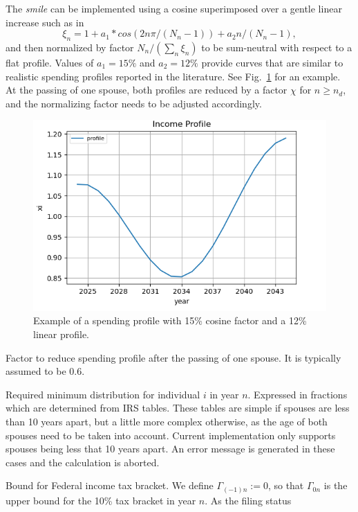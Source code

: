 \documentclass{report}[fleqn,12pt]
\begin{document}
\begin{description}[leftmargin=4em,style=multiline]
	The {\em smile} can be implemented using a cosine superimposed over a gentle linear increase
	such as in
	\begin{equation}
		\xi_n = 1 + a_1*cos(2n\pi/(N_n-1)) + a_2n/(N_n-1),
	\end{equation}
	and then normalized by factor $N_n/(\sum_n \xi_n )$ to be sum-neutral with respect to a flat profile.
	Values of $a_1 = 15\%$ and $a_2=12\%$ provide curves that are similar to realistic
		spending profiles reported in the literature. See Fig.~\ref{Fig:profile} for an example.
	At the passing of one spouse, both profiles are reduced by a factor $\chi$ for $n \ge n_d$,
	and the normalizing factor needs to be adjusted accordingly.
		\begin{figure}[t]
		\includegraphics{profile.png}
		\caption{\small Example of a spending profile with 15\% cosine factor and a 12\% linear
		profile. \label{Fig:profile}}
		\end{figure}
\item [$\chi$]
	Factor to reduce spending profile after the passing of one spouse. It is typically
	assumed to be 0.6.
\item [$\rho_{in}$]
	Required minimum distribution for individual $i$ in year $n$. Expressed in fractions
	which are determined from IRS tables. These tables are simple if spouses are less than 10 years apart,
	but a little more complex otherwise, as the age of both spouses need to be taken into account.
	Current implementation only supports spouses being less that 10 years apart.
	An error message is generated in these cases and the calculation is aborted.
\item [$\Gamma_{tn}$]
	Bound for Federal income tax bracket. We define $\Gamma_{(-1)n} := 0$, so that
	$\Gamma_{0n}$ is the upper bound for the 10\% tax bracket in year $n$. As the filing status

\end{description}
\end{document}

